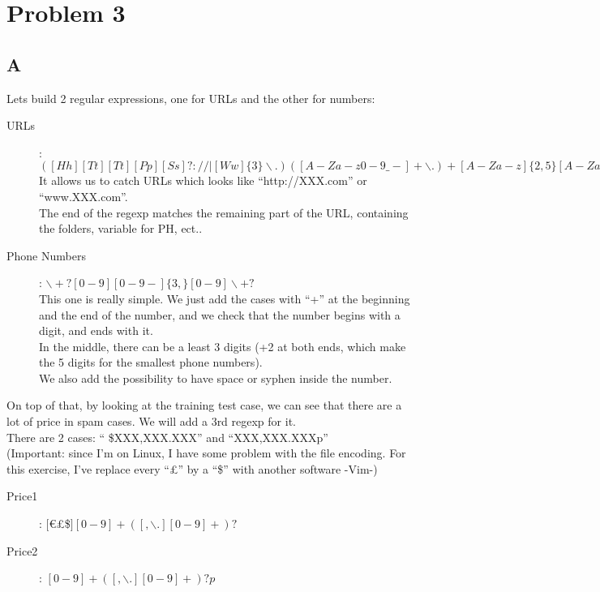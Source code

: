 \documentclass{article}
\begin{document}
    \section{Problem 3}
        \subsection{A}
            Lets build 2 regular expressions, one for URLs and the other for numbers:
            \begin{description}
                \item[URLs]: $([Hh][Tt][Tt][Pp][Ss]?://|[Ww]\{3\}\backslash .)([A-Za-z0-9\_ -]+\backslash .)+[A-Za-z]\{2,5\}[A-Za-z0-9/\_? = -]*$\\
                    It allows us to catch URLs which looks like ``http://XXX.com'' or ``www.XXX.com''.\\
                    The end of the regexp matches the remaining part of the URL, containing the folders, variable for PH, ect..
                \item[Phone Numbers]: $\backslash+?[0-9][0-9 -]\{3,\}[0-9]\backslash+?$\\
                    This one is really simple. We just add the cases with ``+'' at the beginning and the end of the number, and we check that the number begins with a digit, and ends with it.\\
                    In the middle, there can be a least 3 digits (+2 at both ends, which make the 5 digits for the smallest phone numbers).\\
                    We also add the possibility to have space or syphen inside the number.
            \end{description}
            On top of that, by looking at the training test case, we can see that there are a lot of price in spam cases. We will add a 3rd regexp for it.\\
            There are 2 cases: `` \$XXX,XXX.XXX'' and ``XXX,XXX.XXXp''\\
            (Important: since I'm on Linux, I have some problem with the file encoding. For this exercise, I've replace every ``£'' by a ``\$'' with another software -Vim-)
            \begin{description}
                \item[Price1]: $[$\euro£\$$][0-9]+([,\backslash.][0-9]+)?$
                \item[Price2]: $[0-9]+([,\backslash.][0-9]+)?p$
            \end{description}
\end{document}
